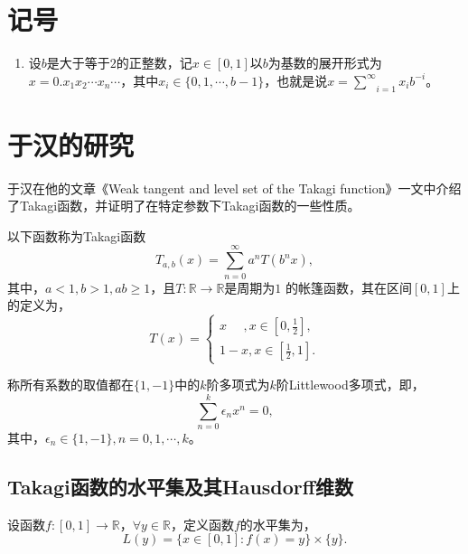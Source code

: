\cleardoublepage

\section{记号}
\begin{enumerate}
      \item 设$b$是大于等于$2$的正整数，记$x\in[0,1]$以$b$为基数的展开形式为$x=0.x_1x_2\cdots x_n\cdots$，其中$x_i\in\{0,1,\cdots,b-1\}$，也就是说$x=\underset{i=1}{\overset{\infty}{\sum}}x_ib^{-i}$。
\end{enumerate}



\section{于汉的研究}

于汉在他的文章《Weak tangent and level set of the Takagi function》一文中介绍了Takagi函数，并证明了在特定参数下Takagi函数的一些性质。

\begin{definition}[Takagi 函数]
        以下函数称为Takagi函数
        $$
            T_{a,b}(x)=\sum_{n=0}^\infty a^nT(b^nx),
        $$
        其中，$a<1,b>1,ab\ge1$，且$T:\mathbb{R}\rightarrow\mathbb{R}$是周期为$1$ 的帐篷函数，其在区间$[0,1]$上的定义为，
        $$
            T(x)=
            \begin{cases}
                x~~~~~~,x\in[0,\frac{1}{2}],\\
                1-x,x\in[\frac{1}{2},1].
            \end{cases}
        $$

        \begin{definition}[Littlewood多项式]
            称所有系数的取值都在$\{1,-1\}$中的$k$阶多项式为$k$阶Littlewood多项式，即，
            $$
                \sum_{n=0}^k\epsilon_nx^n=0,
            $$
            其中，$\epsilon_n\in\{1,-1\},n=0,1,\cdots,k$。
        \end{definition}
\end{definition}

\subsection{Takagi函数的水平集及其Hausdorff维数}

\begin{definition}[水平集]
    设函数$f:[0,1]\rightarrow\mathbb{R}$，$\forall y \in\mathbb{R}$，定义函数$f$的水平集为，
    $$
        L(y)=\{x\in[0,1]:f(x)=y\}\times\{y\}.
    $$
\end{definition}

